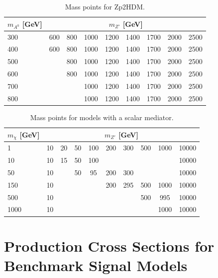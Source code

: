 \begin{table}[htbH] 
\begin{center} 
\begin{tabular}{ l | c | c | c | c | c | c | c | c} 
\hline 
$m_{A^0}$ [GeV] & \multicolumn{8}{|c}{$m_{Z'}$ [GeV]} \\ 
\hline 
300 & 600 & 800 & 1000 & 1200 & 1400 & 1700 & 2000 & 2500 \\ 
400 & 600 & 800 & 1000 & 1200 & 1400 & 1700 & 2000 & 2500 \\ 
500 & & 800 & 1000 & 1200 & 1400 & 1700 & 2000 & 2500 \\ 
600 & & 800 & 1000 & 1200 & 1400 & 1700 & 2000 & 2500 \\
700 & & & 1000 & 1200 & 1400 & 1700 & 2000 & 2500 \\ 
800 & & & 1000 & 1200 & 1400 & 1700 & 2000 & 2500 \\ 
\hline
\end{tabular} 
\caption{Mass points for Zp2HDM.}\label{tab:MM2HDM} 
\end{center} 
\end{table} 

\begin{table}[htbH] 
\begin{center} 
\begin{tabular}{ l | c | c | c | c | c | c | c | c | c} 
\hline 
$m_\chi$ [GeV] & \multicolumn{9}{c}{$m_{Z'}$ [GeV]} \\ 
\hline 
1 & 10 & 20 & 50 & 100 & 200 & 300 & 500 & 1000 & 10000 \\
10 & 10 & 15 & 50 & 100 & & & & & 10000 \\
50 & 10 & & 50 & 95  & 200 & 300 & & & 10000 \\
150 & 10 & & & & 200 & 295 & 500 & 1000 & 10000 \\
500 & 10 & & & & & & 500 & 995 & 10000 \\
1000 & 10 & & & & & & & 1000 & 10000 \\
\hline
\end{tabular} 
\caption{Mass points for models with a scalar mediator.}\label{tab:MMScalar} 
\end{center} 
\end{table} 

\appendix
\section{Production Cross Sections for Benchmark Signal Models}

